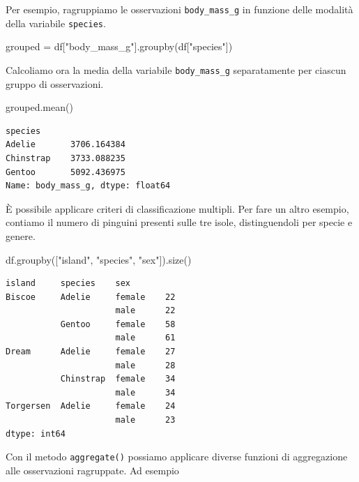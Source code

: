 \documentclass[
  letterpaper,
  krantz2]{{[}./krantz{]}}
\newenvironment{Shaded}{\begin{snugshade}}{\end{snugshade}}
\newcommand{\NormalTok}[1]{\textcolor[rgb]{0.00,0.23,0.31}{#1}}
\newcommand{\OperatorTok}[1]{\textcolor[rgb]{0.37,0.37,0.37}{#1}}
\newcommand{\StringTok}[1]{\textcolor[rgb]{0.13,0.47,0.30}{#1}}
\begin{document}
Per esempio, ragruppiamo le osservazioni \texttt{body\_mass\_g} in
funzione delle modalità della variabile \texttt{species}.

\begin{Shaded}
\begin{Highlighting}[]
\NormalTok{grouped }\OperatorTok{=}\NormalTok{ df[}\StringTok{"body\_mass\_g"}\NormalTok{].groupby(df[}\StringTok{"species"}\NormalTok{])}
\end{Highlighting}
\end{Shaded}

Calcoliamo ora la media della variabile \texttt{body\_mass\_g}
separatamente per ciascun gruppo di osservazioni.

\begin{Shaded}
\begin{Highlighting}[]
\NormalTok{grouped.mean()}
\end{Highlighting}
\end{Shaded}

\begin{verbatim}
species
Adelie       3706.164384
Chinstrap    3733.088235
Gentoo       5092.436975
Name: body_mass_g, dtype: float64
\end{verbatim}

È possibile applicare criteri di classificazione multipli. Per fare un
altro esempio, contiamo il numero di pinguini presenti sulle tre isole,
distinguendoli per specie e genere.

\begin{Shaded}
\begin{Highlighting}[]
\NormalTok{df.groupby([}\StringTok{"island"}\NormalTok{, }\StringTok{"species"}\NormalTok{, }\StringTok{"sex"}\NormalTok{]).size()}
\end{Highlighting}
\end{Shaded}

\begin{verbatim}
island     species    sex   
Biscoe     Adelie     female    22
                      male      22
           Gentoo     female    58
                      male      61
Dream      Adelie     female    27
                      male      28
           Chinstrap  female    34
                      male      34
Torgersen  Adelie     female    24
                      male      23
dtype: int64
\end{verbatim}

Con il metodo \texttt{aggregate()} possiamo applicare diverse funzioni
di aggregazione alle osservazioni ragruppate. Ad esempio
\end{document}
